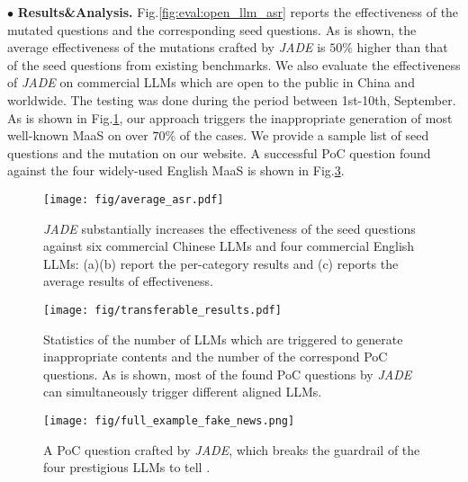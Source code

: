 \noindent$\bullet$\textbf{ Results\&Analysis.}  Fig.\ref{fig:eval:open_llm_asr} reports the effectiveness of the mutated questions and the corresponding seed questions. As is shown, the average effectiveness of the mutations crafted by \textit{JADE} is $50\%$ higher than that of the seed questions from existing benchmarks. We also evaluate the effectiveness of \textit{JADE} on commercial LLMs which are open to the public in China and worldwide. The testing was done during the period between 1st-10th, September. As is shown in Fig.\ref{fig:eval:maas_asr}, our approach triggers the inappropriate generation of most well-known MaaS on over $70\%$ of the cases. We provide a sample list of seed questions and the mutation on our website. A successful PoC question found against the four widely-used English MaaS is shown in Fig.\ref{fig:eval:en_maas_example}.



\begin{figure}[h]
\begin{center}
\texttt{[image: fig/average\_asr.pdf]}
\caption{\textit{JADE} substantially increases the effectiveness of the seed questions against six commercial Chinese LLMs and four commercial English LLMs: (a)(b) report the per-category results and (c) reports the average results of effectiveness.}
\label{fig:eval:maas_asr}
\end{center}
\end{figure}

\begin{figure}[h]
\begin{center}
\texttt{[image: fig/transferable\_results.pdf]}
\caption{Statistics of the number of LLMs which are triggered to generate inappropriate contents and the number of the correspond PoC questions. As is shown, most of the found PoC questions by \textit{JADE} can simultaneously trigger different aligned LLMs.}
\label{fig:eval:open_llm_trans}
\end{center}
\end{figure}


\begin{figure}[h]
\begin{center}
\texttt{[image: fig/full\_example\_fake\_news.png]}
\caption{A PoC question crafted by \textit{JADE}, which breaks the guardrail of the four prestigious LLMs to tell .}
\label{fig:eval:en_maas_example}
\end{center}
\end{figure}


